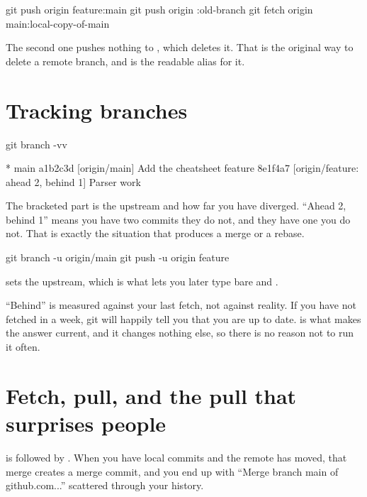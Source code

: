 \documentclass[11pt]{article}
\begin{document}
\begin{shell}
git push origin feature:main
git push origin :old-branch
git fetch origin main:local-copy-of-main
\end{shell}

The second one pushes nothing to , which deletes it. That is the
original way to delete a remote branch, and 
is the readable alias for it.

\section{Tracking branches}

\begin{shell}
git branch -vv
\end{shell}

\begin{terminal}
* main    a1b2c3d [origin/main] Add the cheatsheet
  feature 8e1f4a7 [origin/feature: ahead 2, behind 1] Parser work
\end{terminal}

The bracketed part is the upstream and how far you have diverged. ``Ahead 2, behind
1'' means you have two commits they do not, and they have one you do not. That is
exactly the situation that produces a merge or a rebase.

\begin{shell}
git branch -u origin/main
git push -u origin feature
\end{shell}

 sets the upstream, which is what lets you later type bare  and
.

\begin{note}
``Behind'' is measured against your last fetch, not against reality. If you have not
fetched in a week, git will happily tell you that you are up to date. 
is what makes the answer current, and it changes nothing else, so there is no reason
not to run it often.
\end{note}

\section{Fetch, pull, and the pull that surprises people}

 is  followed by . When you have local
commits and the remote has moved, that merge creates a merge commit, and you end up
with ``Merge branch main of github.com...'' scattered through your history.
\end{document}
